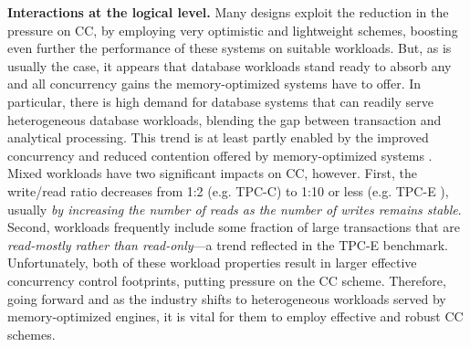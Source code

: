 \vspace{2mm}
{\bf Interactions at the logical level.} 
Many designs exploit the reduction in the pressure on CC, by employing very optimistic and lightweight schemes, boosting even further the performance of these systems on suitable workloads.
But, as is usually the case, it appears that database workloads stand ready to absorb any and all concurrency gains the memory-optimized systems have to offer. In particular, there is high demand for database systems that can readily serve heterogeneous database workloads, blending the gap between transaction and analytical processing. This trend is at least partly enabled by the improved concurrency and reduced contention offered by memory-optimized systems \cite{Farber+12}. Mixed workloads have two significant impacts on CC, however. First, the write/read ratio decreases from 1:2 (e.g. TPC-C) to 1:10 or less (e.g. TPC-E \cite{Chen+10,TozunPKJA13}), usually {\it by increasing the number of reads as the number of writes remains stable}.
Second, workloads frequently include some fraction of large transactions that are {\it read-mostly rather than read-only}---a trend reflected in the TPC-E benchmark. Unfortunately, both of these workload properties result in larger effective concurrency control footprints, putting pressure on the CC scheme. 
Therefore, going forward and as the industry shifts to heterogeneous workloads served by memory-optimized engines, it is vital for them to employ effective and robust CC schemes. 


